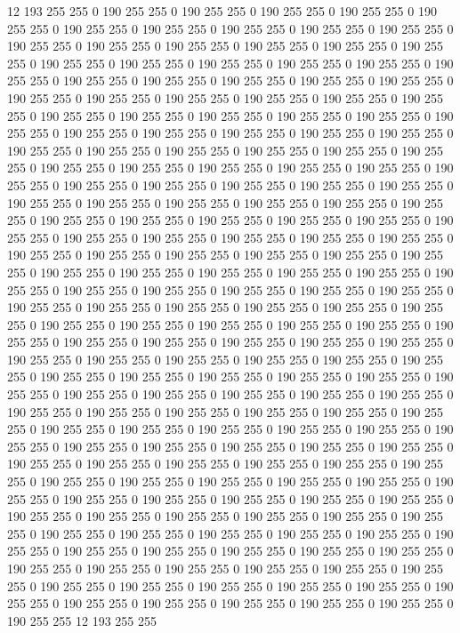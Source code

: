 12 193 255 255 0 190 255 255 0 190 255 255 0 190 255 255 0 190 255 255 0 190 255 255 0 190 255 255 0 190 255 255 0 190 255 255 0 190 255 255 0 190 255 255 0 190 255 255 0 190 255 255 0 190 255 255 0 190 255 255 0 190 255 255 0 190 255 255 0 190 255 255 0 190 255 255 0 190 255 255 0 190 255 255 0 190 255 255 0 190 255 255 0 190 255 255 0 190 255 255 0 190 255 255 0 190 255 255 0 190 255 255 0 190 255 255 0 190 255 255 0 190 255 255 0 190 255 255 0 190 255 255 0 190 255 255 0 190 255 255 0 190 255 255 0 190 255 255 0 190 255 255 0 190 255 255 0 190 255 255 0 190 255 255 0 190 255 255 0 190 255 255 0 190 255 255 0 190 255 255 0 190 255 255 0 190 255 255 0 190 255 255 0 190 255 255 0 190 255 255 
0 190 255 255 0 190 255 255 0 190 255 255 0 190 255 255 0 190 255 255 0 190 255 255 0 190 255 255 0 190 255 255 0 190 255 255 0 190 255 255 0 190 255 255 0 190 255 255 0 190 255 255 0 190 255 255 0 190 255 255 0 190 255 255 0 190 255 255 0 190 255 255 0 190 255 255 0 190 255 255 0 190 255 255 0 190 255 255 0 190 255 255 0 190 255 255 0 190 255 255 0 190 255 255 0 190 255 255 0 190 255 255 0 190 255 255 0 190 255 255 0 190 255 255 0 190 255 255 0 190 255 255 0 190 255 255 0 190 255 255 0 190 255 255 0 190 255 255 0 190 255 255 0 190 255 255 0 190 255 255 0 190 255 255 0 190 255 255 0 190 255 255 0 190 255 255 0 190 255 255 0 190 255 255 0 190 255 255 0 190 255 255 0 190 255 255 0 190 255 255 
0 190 255 255 0 190 255 255 0 190 255 255 0 190 255 255 0 190 255 255 0 190 255 255 0 190 255 255 0 190 255 255 0 190 255 255 0 190 255 255 0 190 255 255 0 190 255 255 0 190 255 255 0 190 255 255 0 190 255 255 0 190 255 255 0 190 255 255 0 190 255 255 0 190 255 255 0 190 255 255 0 190 255 255 0 190 255 255 0 190 255 255 0 190 255 255 0 190 255 255 0 190 255 255 0 190 255 255 0 190 255 255 0 190 255 255 0 190 255 255 0 190 255 255 0 190 255 255 0 190 255 255 0 190 255 255 0 190 255 255 0 190 255 255 0 190 255 255 0 190 255 255 0 190 255 255 0 190 255 255 0 190 255 255 0 190 255 255 0 190 255 255 0 190 255 255 0 190 255 255 0 190 255 255 0 190 255 255 0 190 255 255 0 190 255 255 0 190 255 255 
0 190 255 255 0 190 255 255 0 190 255 255 0 190 255 255 0 190 255 255 0 190 255 255 0 190 255 255 0 190 255 255 0 190 255 255 0 190 255 255 0 190 255 255 0 190 255 255 0 190 255 255 0 190 255 255 0 190 255 255 0 190 255 255 0 190 255 255 0 190 255 255 0 190 255 255 0 190 255 255 0 190 255 255 0 190 255 255 0 190 255 255 0 190 255 255 0 190 255 255 0 190 255 255 0 190 255 255 0 190 255 255 0 190 255 255 0 190 255 255 0 190 255 255 0 190 255 255 0 190 255 255 0 190 255 255 0 190 255 255 0 190 255 255 0 190 255 255 0 190 255 255 0 190 255 255 0 190 255 255 0 190 255 255 0 190 255 255 0 190 255 255 0 190 255 255 0 190 255 255 0 190 255 255 0 190 255 255 0 190 255 255 0 190 255 255 12 193 255 255 
